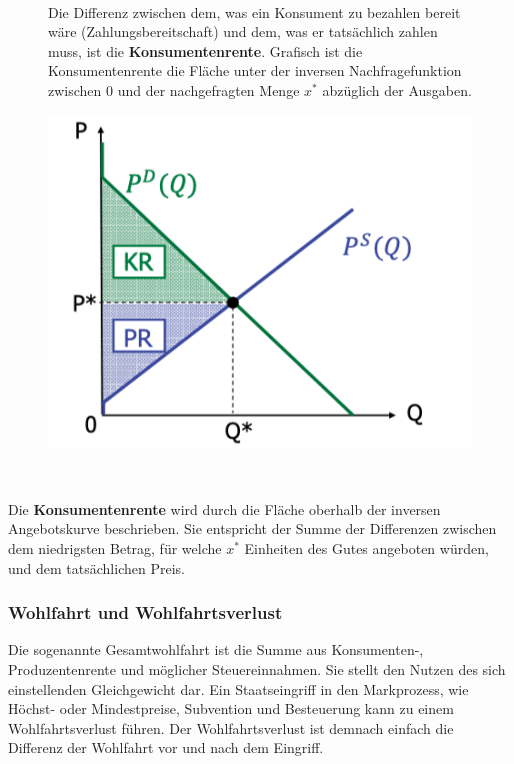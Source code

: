 \begin{figure}[htbp!]
	\begin{minipage}[t]{9cm}\vspace{0pt} ~\\
		Die Differenz zwischen dem, was ein Konsument zu bezahlen bereit wäre (Zahlungsbereitschaft) und dem, was er tatsächlich zahlen muss, ist die \textbf{Konsumentenrente}. Grafisch ist die Konsumentenrente die Fläche unter der inversen Nachfragefunktion zwischen 0 und der nachgefragten Menge $x^*$ abzüglich der Ausgaben.
	\end{minipage}
	\hspace{0.25cm}
	\begin{minipage}[t]{3cm}\vspace{1pt}
		\includegraphics[scale=0.5]{img/krpr}
	\end{minipage}
\end{figure}  ~\smallskip

Die \textbf{Konsumentenrente} wird durch die Fläche oberhalb der inversen Angebotskurve beschrieben. Sie entspricht der Summe der Differenzen zwischen dem niedrigsten Betrag, für welche $x^*$ Einheiten des Gutes angeboten würden, und dem tatsächlichen Preis.  ~\newpage
		
\subsubsection*{Wohlfahrt und Wohlfahrtsverlust}

Die sogenannte Gesamtwohlfahrt ist die Summe aus Konsumenten-, Produzentenrente und möglicher Steuereinnahmen. Sie stellt den Nutzen des sich einstellenden Gleichgewicht dar. Ein Staatseingriff in den Markprozess, wie Höchst- oder Mindestpreise, Subvention und Besteuerung kann zu einem Wohlfahrtsverlust führen. Der Wohlfahrtsverlust ist demnach einfach die Differenz der Wohlfahrt vor und nach dem Eingriff. ~\bigskip

